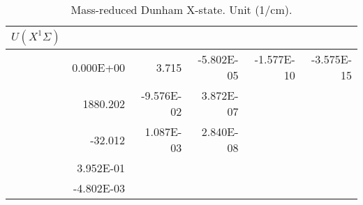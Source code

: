 \begin{table}[h]
\begin{tabular}{crrrrr}
\toprule
$U (X^1\Sigma)$\\ \midrule 
& 0.000E+00 & 3.715 & -5.802E-05 & -1.577E-10 & -3.575E-15 \\
& 1880.202 & -9.576E-02 & 3.872E-07 \\
& -32.012 & 1.087E-03 & 2.840E-08 \\
& 3.952E-01 \\
& -4.802E-03 \\
\bottomrule
\end{tabular}\caption{Mass-reduced Dunham X-state. Unit (1/cm).}\end{table}
